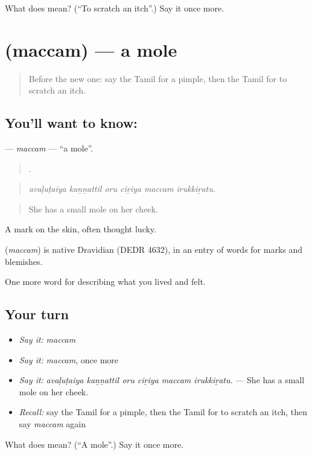 \begin{tcolorbox}[breakable,colback=teal!4,colframe=teal!35!black,title={Before you move on}]
What does  mean? (\textquotedblleft{}To scratch an itch\textquotedblright{}.) Say it once more.
\end{tcolorbox}
\section[\texorpdfstring{\ta{மச்சம்} (maccam)}{மச்சம் (maccam)}]{ (maccam) — a mole}

\label{lesson:TA-C483-maccam}



\begin{quote}
Before the new one: say the Tamil for a pimple, then the Tamil for to scratch an itch.
\end{quote}

\subsection*{You'll want to know: }
\textbf{} — \emph{maccam} — \textquotedblleft{}a mole\textquotedblright{}.

\begin{quote}
     .
\end{quote}

\begin{quote}
\emph{avaḷuṭaiya kaṉṉattil oru ciṟiya maccam irukkiṟatu.}
\end{quote}

\begin{quote}
She has a small mole on her cheek.
\end{quote}

A mark on the skin, often thought lucky.

\begin{cousinweb}
\textbf{} (\emph{maccam}) is native Dravidian (DEDR 4632), in an entry of words for marks and blemishes.
\end{cousinweb}

\begin{grammarlens}[title={What you've built}]
One more word for describing what you lived and felt.
\end{grammarlens}

\subsection*{Your turn}
\begin{itemize}
\raggedright
  \item \emph{Say it:} \emph{maccam}
  \item \emph{Say it:} \emph{maccam}, once more
  \item \emph{Say it:} \emph{avaḷuṭaiya kaṉṉattil oru ciṟiya maccam irukkiṟatu.} — She has a small mole on her cheek.
  \item \emph{Recall:} say the Tamil for a pimple, then the Tamil for to scratch an itch, then say \emph{maccam} again
\end{itemize}

\begin{tcolorbox}[breakable,colback=teal!4,colframe=teal!35!black,title={Before you move on}]
What does  mean? (\textquotedblleft{}A mole\textquotedblright{}.) Say it once more.
\end{tcolorbox}
